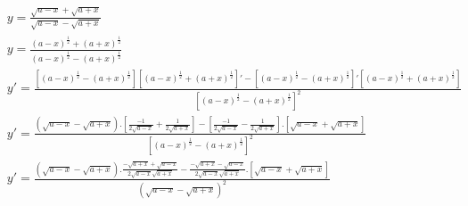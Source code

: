 \begin{ex}
\begin{align}
&y=\frac{\sqrt{a-x}+\sqrt{a+x}}{\sqrt{a-x}-\sqrt{a+x}}\nonumber\\
&y=\frac{(a-x)^\frac{1}{2}+(a+x)^\frac{1}{2}}{(a-x)^\frac{1}{2}-(a+x)^\frac{1}{2}}\nonumber\\
&y'=\frac{\left[(a-x)^\frac{1}{2}-(a+x)^\frac{1}{2}\right]\left[(a-x)^\frac{1}{2}+(a+x)^\frac{1}{2}\right]'-\left[(a-x)^\frac{1}{2}-(a+x)^\frac{1}{2}\right]'\left[(a-x)^\frac{1}{2}+(a+x)^\frac{1}{2}\right]}{\left[(a-x)^\frac{1}{2}-(a+x)^\frac{1}{2}\right]^2}\nonumber\\
&y'=\frac{(\sqrt{a-x}-\sqrt{a+x}).\left[\frac{-1}{2\sqrt{a-x}}+\frac{1}{2\sqrt{a+x}}\right]-\left[\frac{-1}{2\sqrt{a-x}}-\frac{1}{2\sqrt{a+x}}\right].\left[\sqrt{a-x}+\sqrt{a+x}\right]}{\left[(a-x)^\frac{1}{2}-(a+x)^\frac{1}{2}\right]^2}\nonumber\\
&y'=\frac{(\sqrt{a-x}-\sqrt{a+x}).\frac{-\sqrt{a+x}+\sqrt{a-x}}{2\sqrt{a-x}\sqrt{a+x}}-\frac{-\sqrt{a+x}-\sqrt{a-x}}{2\sqrt{a-x}{\sqrt{a+x}}}.\left[\sqrt{a-x}+\sqrt{a+x}\right]}{(\sqrt{a-x}-\sqrt{a+x})^2}\nonumber
\end{align}
\end{ex}